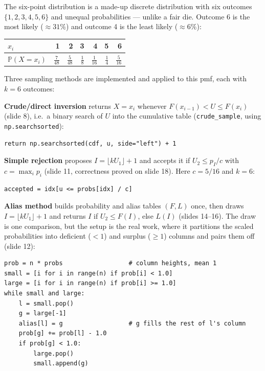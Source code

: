 The six-point distribution is a made-up discrete distribution with six
outcomes $\{1, 2, 3, 4, 5, 6\}$ and unequal probabilities --- unlike a
fair die. Outcome 6 is the most likely ($\approx 31\%$) and outcome 4 is
the least likely ($\approx 6\%$):
\begin{center}
\renewcommand{\arraystretch}{1.1}
\begin{tabular}{lrrrrrr}
    \toprule
    $x_i$               & 1              & 2              & 3             & 4              & 5             & 6              \\
    \midrule
    $\mathbb{P}(X=x_i)$ & $\tfrac{7}{48}$ & $\tfrac{5}{48}$ & $\tfrac{1}{8}$ & $\tfrac{1}{16}$ & $\tfrac{1}{4}$ & $\tfrac{5}{16}$ \\
    \bottomrule
\end{tabular}
\end{center}
 
Three sampling methods are implemented and applied to this pmf, each with
$k = 6$ outcomes:

\textbf{Crude/direct inversion} returns $X = x_i$ whenever
$F(x_{i-1}) < U \leq F(x_i)$ (slide 8), i.e.\ a binary
search of $U$ into the cumulative table (\texttt{crude\_sample}, using
\texttt{np.searchsorted}):
\begin{verbatim}
return np.searchsorted(cdf, u, side="left") + 1
\end{verbatim}

\textbf{Simple rejection} proposes $I = \lfloor kU_1 \rfloor + 1$ and accepts
it if $U_2 \leq p_I / c$ with $c = \max_i p_i$ (slide 11,
correctness proved on slide 18). Here $c = 5/16$ and $k = 6$:
\begin{verbatim}
accepted = idx[u <= probs[idx] / c]
\end{verbatim}

\textbf{Alias method} builds probability and alias tables $(F, L)$ once, then
draws $I = \lfloor kU_1 \rfloor + 1$ and returns $I$ if $U_2 \leq F(I)$, else
$L(I)$ (slides 14--16). The draw is one comparison, but the setup is the
real work, where it partitions the scaled probabilities into deficient
($<1$) and surplus ($\geq 1$) columns and pairs them off (slide 12):
\begin{verbatim}
prob = n * probs                  # column heights, mean 1
small = [i for i in range(n) if prob[i] < 1.0]
large = [i for i in range(n) if prob[i] >= 1.0]
while small and large:
    l = small.pop()
    g = large[-1]
    alias[l] = g                  # g fills the rest of l's column
    prob[g] += prob[l] - 1.0
    if prob[g] < 1.0:
        large.pop()
        small.append(g)
\end{verbatim}

